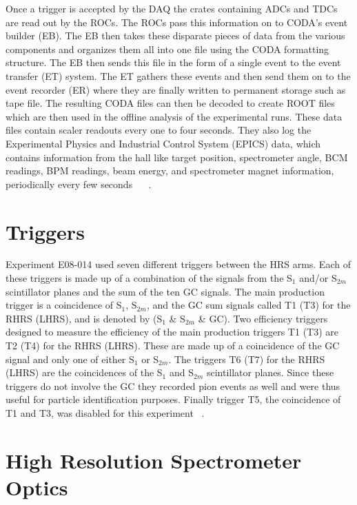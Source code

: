 Once a trigger is accepted by the DAQ the crates containing ADCs and TDCs are read out by the ROCs. The ROCs pass this information on to CODA's event builder (EB). The EB then takes these disparate pieces of data from the various components and organizes them all into one file using the CODA formatting structure. The EB then sends this file in the form of a single event to the event transfer (ET) system. The ET gathers these events and then send them on to the event recorder (ER) where they are finally written to permanent storage such as tape file. The resulting CODA files can then be decoded to create ROOT files which are then used in the offline analysis of the experimental runs. These data files contain scaler readouts every one to four seconds. They also log the Experimental Physics and Industrial Control System (EPICS) data, which contains information from the hall like target position, spectrometer angle, BCM readings, BPM readings, beam energy, and spectrometer magnet information, periodically every few seconds ~\cite{DAQ} ~\cite{Thesis:Ye}. 

\section{Triggers}
\label{sec:triggers}

Experiment E08-014 used seven different triggers between the HRS arms. Each of these triggers is made up of a combination of the signals from the S$_1$ and/or S$_{2m}$ scintillator planes and the sum of the ten GC signals. The main production trigger is a coincidence of S$_1$, S$_{2m}$, and the GC sum signals called T1 (T3) for the RHRS (LHRS), and is denoted by (S$_1$ \& S$_{2m}$ \& GC). Two efficiency triggers designed to measure the efficiency of the main production triggers T1 (T3) are T2 (T4) for the RHRS (LHRS). These are made up of a coincidence of the GC signal and only one of either S$_1$ or S$_{2m}$. The triggers T6 (T7) for the RHRS (LHRS) are the coincidences of the S$_1$ and S$_{2m}$ scintillator planes. Since these triggers do not involve the GC they recorded pion events as well and were thus useful for particle identification purposes. Finally trigger T5, the coincidence of T1 and T3, was disabled for this experiment ~\cite{Thesis:Ye}. 

\section{High Resolution Spectrometer Optics}
\label{sec:optics}

